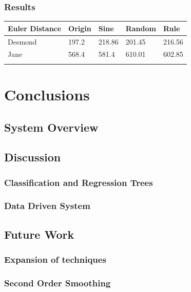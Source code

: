 \documentclass[bsc,frontabs,twoside,singlespacing,parskip]{infthesis}
\begin{document}
\subsection{Results}

\begin{table}[h]
\begin{tabular}{@{}lllll@{}}
\toprule
Euler Distance & Origin & Sine   & Random & Rule   \\ \midrule
Desmond        & 197.2  & 218.86 & 201.45 & 216.56 \\
Jane           & 568.4  & 581.4  & 610.01 & 602.85 \\
               &        &        &        &        \\ \bottomrule
\end{tabular}
\end{table}

\chapter{Conclusions}



\section{System Overview}

\section{Discussion}

\subsection{Classification and Regression Trees}

\subsection{Data Driven System}

\section{Future Work}

\subsection{Expansion of techniques}

\subsection{Second Order Smoothing}
	


\end{document}
